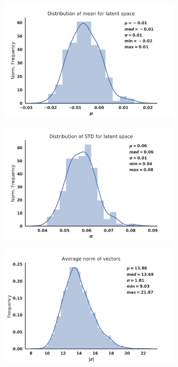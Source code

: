 \begin{figure}[h]
\centering
  \begin{subfigure}{0.45\textwidth}
    \caption{}
    \includegraphics[width=\textwidth]{./mean_Z.png}
  \end{subfigure}
  \begin{subfigure}{0.45\textwidth}
    \caption{}
    \includegraphics[width=\textwidth]{./STD_Z.png}
  \end{subfigure}
  \vspace{1em}
  \begin{subfigure}{0.45\textwidth}
    \caption{}
    \includegraphics[width=\textwidth]{./norm_Z.png}

\end{subfigure}
\end{figure}
